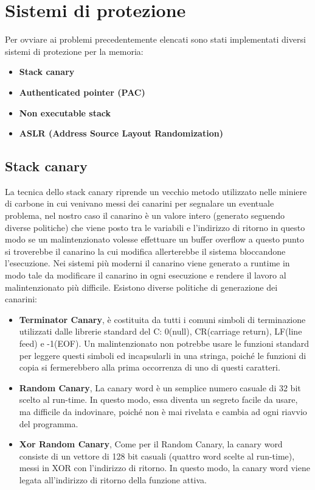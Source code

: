 \section{Sistemi di protezione}
Per ovviare ai problemi precedentemente elencati sono stati implementati diversi sistemi di protezione per la memoria:
\begin{itemize}
    \item \textbf{Stack canary}
    \item \textbf{Authenticated pointer (PAC)}
    \item \textbf{Non executable stack}
    \item \textbf{ASLR (Address Source Layout Randomization)}
\end{itemize}

\subsection{Stack canary}
La tecnica dello stack canary riprende un vecchio metodo utilizzato nelle miniere di carbone in cui venivano messi dei canarini per segnalare un eventuale problema, nel nostro caso il canarino è un valore intero (generato seguendo diverse politiche) che viene posto tra le variabili e l'indirizzo di ritorno in questo modo se un malintenzionato volesse effettuare un buffer overflow a questo punto si troverebbe il canarino la cui modifica allerterebbe il sistema bloccandone l'esecuzione.
Nei sistemi più moderni il canarino viene generato a runtime in modo tale da modificare il canarino in ogni esecuzione e rendere il lavoro al malintenzionato più difficile.
Esistono diverse politiche di generazione dei canarini:
\begin{itemize}
    \item \textbf{Terminator Canary}, è costituita da tutti i comuni simboli di terminazione utilizzati dalle librerie standard del C: 0(null), CR(carriage return), LF(line feed) e -1(EOF). Un malintenzionato non potrebbe usare le funzioni standard per leggere questi simboli ed incapsularli in una stringa, poiché le funzioni di copia si fermerebbero alla prima occorrenza di uno di questi caratteri.
    \item \textbf{Random Canary}, La canary word è un semplice numero casuale di 32 bit scelto al run-time. In questo modo, essa diventa un segreto facile da usare, ma difficile da indovinare, poiché non è mai rivelata e cambia ad ogni riavvio del programma.
    \item \textbf{Xor Random Canary}, Come per il Random Canary, la canary word consiste di un vettore di 128 bit casuali (quattro word scelte al run-time), messi in XOR con l'indirizzo di ritorno. In questo modo, la canary word viene legata all'indirizzo di ritorno della funzione attiva.
\end{itemize}

